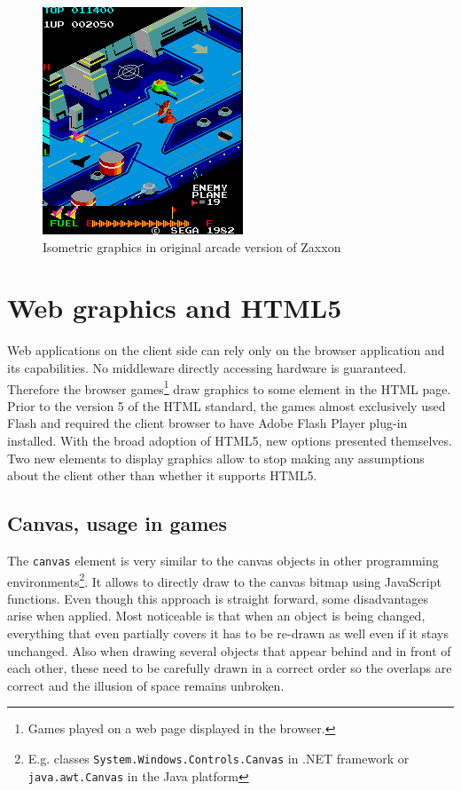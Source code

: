\documentclass[11pt,oneside, final]{fithesis2}
\begin{document}
\begin{figure}[htp]
	\centering
	\includegraphics{zaxxon}
	\caption{Isometric graphics in original arcade version of Zaxxon\cite{zaxxon}}
	\label{zaxxon}
\end{figure}

\section{Web graphics and HTML5}
Web applications on the client side can rely only on the browser application and its capabilities. No middleware directly accessing hardware is guaranteed. Therefore the browser games\footnote{Games played on a web page displayed in the browser.} draw graphics to some element in the HTML page. Prior to the version 5 of the HTML standard, the games almost exclusively used Flash and required the client browser to have Adobe Flash Player plug-in installed\cite{flashplayer}. With the broad adoption of HTML5, new options presented themselves. Two new elements to display graphics allow to stop making any assumptions about the client other than whether it supports HTML5.

\subsection{Canvas, usage in games}
The \texttt{canvas} element is very similar to the canvas objects in other programming environments\footnote{E.g. classes \texttt{System.Windows.Controls.Canvas} in .NET framework\cite{net_canvas} or \texttt{java.awt.Canvas} in the Java platform\cite{java_canvas}}. It allows to directly draw to the canvas bitmap using JavaScript functions. Even though this approach is straight forward, some disadvantages arise when applied. Most noticeable is that when an object is being changed, everything that even partially covers it has to be re-drawn as well even if it stays unchanged. Also when drawing several objects that appear behind and in front of each other, these need to be carefully drawn in a correct order so the overlaps are correct and the illusion of space remains unbroken.
\end{document}
